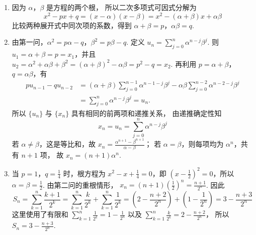 \begin{solution}
\begin{enumerate}
\item 因为 \(\alpha\)，\(\beta\) 是方程的两个根，
所以二次多项式可因式分解为
\[
x^2-px+q=(x-\alpha)(x-\beta)
=x^2-(\alpha+\beta)x+\alpha\beta
\]
比较两种展开式中同次项的系数，得到
\(\alpha+\beta=p\)，\(\alpha\beta=q\).

\item 由第一问，\(\alpha^2=p\alpha-q\)，\(\beta^2=p\beta-q\).
定义 \(u_n=\sum_{j=0}^{n}\alpha^{n-j}\beta^j\). 则
\(u_1=\alpha+\beta=p=x_1\)，并且
\(u_2=\alpha^2+\alpha\beta+\beta^2
=(\alpha+\beta)^2-\alpha\beta=p^2-q=x_2\).
再利用 \(p=\alpha+\beta\)，\(q=\alpha\beta\)，有
\[
\begin{aligned}
pu_{n-1}-qu_{n-2}
&=(\alpha+\beta)\sum_{j=0}^{n-1}\alpha^{n-1-j}\beta^j
-\alpha\beta\sum_{j=0}^{n-2}\alpha^{n-2-j}\beta^j\\
&=\sum_{j=0}^{n}\alpha^{n-j}\beta^j=u_n.
\end{aligned}
\]
所以 \(\{u_n\}\) 与 \(\{x_n\}\) 具有相同的前两项和递推关系，
由递推确定性知
\[
x_n=u_n=\sum_{j=0}^{n}\alpha^{n-j}\beta^j
\]
若 \(\alpha\ne\beta\)，这是等比和，故
\(x_n=\frac{\alpha^{n+1}-\beta^{n+1}}{\alpha-\beta}\)；
若 \(\alpha=\beta\)，则每项均为 \(\alpha^n\)，共有 \(n+1\) 项，
故 \(x_n=(n+1)\alpha^n\).

\item 当 \(p=1\)，\(q=\frac14\) 时，根方程为
\(x^2-x+\frac14=0\)，即
\(\left(x-\frac12\right)^2=0\)，所以 \(\alpha=\beta=\frac12\).
由第二问的重根情形，
\(x_n=(n+1)\left(\frac12\right)^n=\frac{n+1}{2^n}\).
因此
\[
S_n=\sum_{k=1}^{n}\frac{k+1}{2^k}
=\sum_{k=1}^{n}\frac{k}{2^k}+\sum_{k=1}^{n}\frac1{2^k}
=\left(2-\frac{n+2}{2^n}\right)+\left(1-\frac1{2^n}\right)
=3-\frac{n+3}{2^n}
\]
这里使用了有限和
\(\sum_{k=1}^{n}\frac1{2^k}=1-\frac1{2^n}\) 以及
\(\sum_{k=1}^{n}\frac{k}{2^k}=2-\frac{n+2}{2^n}\)，
所以 \(S_n=3-\frac{n+3}{2^n}\).
\end{enumerate}
\end{solution}
